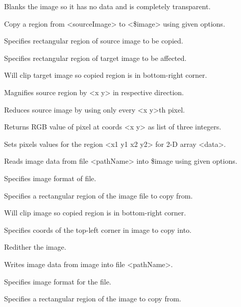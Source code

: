 \begin{enum}{1cm}

Blanks the image so it has no data and is completely transparent.

Copy a region from <sourceImage> to <\$image> using given options.

Specifies rectangular region of source image to be copied.

Specifies rectangular region of target image to be affected.

Will clip target image so copied region is in bottom-right corner.

Magnifies source region by <x y> in respective direction.

Reduces source image by using only every <x y>th pixel.

Returns RGB value of pixel at coords <x y> as list of three integers.

Sets pixels values for the region <x1 y1 x2 y2> for 2-D array <data>.

Reads image data from file <pathName> into \$image using given options.

Specifies image format of file.

Specifies a rectangular region of the image file to copy from.

Will clip image so copied region is in bottom-right corner.

Specifies coords of the top-left corner in image to copy into.

Redither the image.

Writes image data from image into file <pathName>.

Specifies image format for the file.

Specifies a rectangular region of the image to copy from.

\end{enum}

